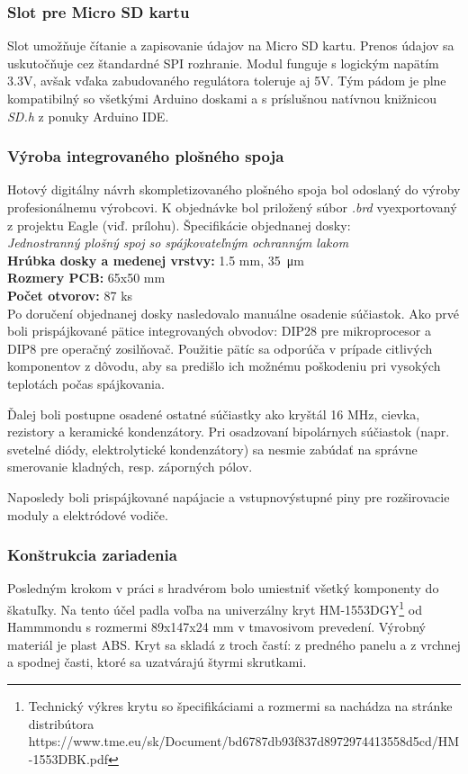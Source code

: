 \documentclass[titlepage,12pt]{article}
\begin{document}
\subsubsection*{Slot pre Micro SD kartu}
Slot umožňuje čítanie a zapisovanie údajov na Micro SD kartu. Prenos údajov sa uskutočňuje cez štandardné SPI rozhranie. Modul funguje s logickým napätím 3.3V, avšak vďaka zabudovaného regulátora toleruje aj 5V. Tým pádom je plne kompatibilný so všetkými Arduino doskami a s príslušnou natívnou knižnicou \emph{SD.h} z ponuky Arduino IDE.

\subsubsection*{Výroba integrovaného plošného spoja}
Hotový digitálny návrh skompletizovaného plošného spoja bol odoslaný do výroby profesionálnemu výrobcovi. K objednávke bol priložený súbor \textit{.brd} vyexportovaný z projektu Eagle (viď. prílohu). Špecifikácie objednanej dosky: \\
\emph{Jednostranný plošný spoj so spájkovateľným ochranným lakom} \\
\textbf{Hrúbka dosky a medenej vrstvy:} 1.5 mm, \SI{35}{\micro\m} \\
\textbf{Rozmery PCB:} 65x50 mm \\
\textbf{Počet otvorov:} 87 ks \\

Po doručení objednanej dosky nasledovalo manuálne osadenie súčiastok. Ako prvé boli prispájkované pätice integrovaných obvodov: DIP28 pre mikroprocesor a DIP8 pre operačný zosilňovač. Použitie pätíc sa odporúča v prípade citlivých komponentov z dôvodu, aby sa predišlo ich možnému poškodeniu pri vysokých teplotách počas spájkovania.

Ďalej boli postupne osadené ostatné súčiastky ako kryštál 16 MHz, cievka, rezistory a keramické kondenzátory. Pri osadzovaní bipolárnych súčiastok (napr. svetelné diódy, elektrolytické kondenzátory) sa nesmie zabúdať na správne smerovanie kladných, resp. záporných pólov.

Naposledy boli prispájkované napájacie a vstupnovýstupné piny pre rozširovacie moduly a elektródové vodiče.

\newpage
\subsubsection{Konštrukcia zariadenia}
Posledným krokom v práci s hradvérom bolo umiestniť všetký komponenty do škatuľky. Na tento účel padla voľba na univerzálny kryt HM-1553DGY\footnote{Technický výkres krytu so špecifikáciami a rozmermi sa nachádza na stránke distribútora https://www.tme.eu/sk/Document/bd6787db93f837d8972974413558d5cd/HM-1553DBK.pdf} od Hammmondu s rozmermi 89x147x24 mm v tmavosivom prevedení. Výrobný materiál je plast ABS. Kryt sa skladá z troch častí: z predného panelu a z vrchnej a spodnej časti, ktoré sa uzatvárajú štyrmi skrutkami. 
\end{document}
